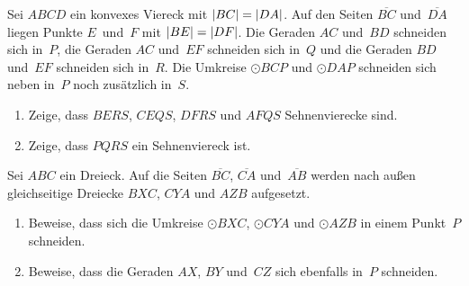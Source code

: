 \begin{aufgabe*}\label{aufgabe:IMO2005_5}
	Sei $ABCD$ ein konvexes Viereck mit $\lvert BC\rvert=\lvert DA\rvert$. Auf den Seiten $\overline{BC}$ und~$\overline{DA}$ liegen Punkte $E$~und~$F$ mit $\lvert BE\rvert=\lvert DF\rvert$. Die Geraden $AC$ und~$BD$ schneiden sich in~$P$, die Geraden $AC$ und~$EF$ schneiden sich in~$Q$ und die Geraden $BD$ und~$EF$ schneiden sich in~$R$. Die Umkreise $\odot BCP$ und $\odot DAP$ schneiden sich neben in~\(P\) noch zusätzlich in~$S$.
	\begin{enumerate}
		\item \label{teilaufgabe:IMO2005_5a}Zeige, dass $BERS$, $CEQS$, $DFRS$ und $AFQS$ Sehnenvierecke sind.
		\item \label{teilaufgabe:IMO2005_5b}Zeige, dass $PQRS$ ein Sehnenviereck ist.
	\end{enumerate}
\end{aufgabe*}

\begin{aufgabe*}\label{aufgabe:FermatPunkt}
	Sei $ABC$ ein Dreieck. Auf die Seiten $\overline{BC}$, $\overline{CA}$ und~$\overline{AB}$ werden nach außen gleichseitige Dreiecke $BXC$, $CYA$ und $AZB$ aufgesetzt.
	\begin{enumerate}
		\item \label{teilaufgabe:FermatPunkt}Beweise, dass sich die Umkreise $\odot BXC$, $\odot CYA$ und $\odot AZB$ in einem Punkt~$P$ schneiden.
		\item \label{teilaufgabe:GeradenSchneidenSichImFermatPunkt}Beweise, dass die Geraden $AX$, $BY$ und~$CZ$ sich ebenfalls in~$P$ schneiden.
	\end{enumerate}
\end{aufgabe*}

